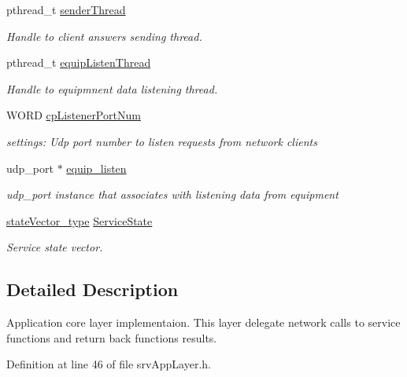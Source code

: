 \begin{DoxyCompactItemize}
pthread\_\-t \hyperlink{classsrvAppLayer_a76a101733f9ede55cd32bff4890bd45c}{senderThread}
\begin{DoxyCompactList}\small\item\em Handle to client answers sending thread. \item\end{DoxyCompactList}\item 
pthread\_\-t \hyperlink{classsrvAppLayer_ae0a4157df420f09cc38a0f51e5b18419}{equipListenThread}
\begin{DoxyCompactList}\small\item\em Handle to equipmnent data listening thread. \item\end{DoxyCompactList}\item 
WORD \hyperlink{classsrvAppLayer_a48dd164d86d1e43d4bd6e775f75986f1}{cpListenerPortNum}
\begin{DoxyCompactList}\small\item\em settings: Udp port number to listen requests from network clients \item\end{DoxyCompactList}\item 
udp\_\-port $\ast$ \hyperlink{classsrvAppLayer_af96e38bd128f37b4facc0957c31ae6ac}{equip\_\-listen}
\begin{DoxyCompactList}\small\item\em udp\_\-port instance that associates with listening data from equipment \item\end{DoxyCompactList}\item 
\hyperlink{structstateVector__type}{stateVector\_\-type} \hyperlink{classsrvAppLayer_ad6ecca4186d37afcf4c94617fa66a990}{ServiceState}
\begin{DoxyCompactList}\small\item\em Service state vector. \item\end{DoxyCompactList}\end{DoxyCompactItemize}


\subsection{Detailed Description}
Application core layer implementaion. This layer delegate network calls to service functions and return back functions results. 

Definition at line 46 of file srvAppLayer.h.



